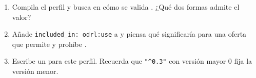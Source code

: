 \begin{retos}
\begin{enumerate}[leftmargin=*, itemsep=2pt]
  \item Compila el perfil y busca en  cómo se valida . ¿Qué dos formas admite
        el valor?
  \item Añade \texttt{included\_in: odrl:use} a  y piensa qué significaría para una oferta que
        permite  y prohíbe .
  \item Escribe un  para este perfil. Recuerda que \texttt{"\textasciicircum{}0.3"} con versión mayor 0 fija la
        versión menor.
\end{enumerate}
\end{retos}
